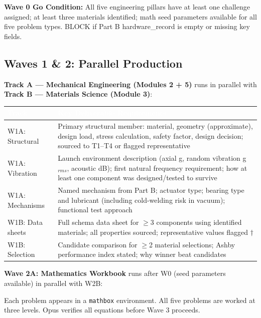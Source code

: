 \documentclass[11pt,letterpaper]{article}
\newcommand{\tableheader}[1]{\textbf{\sffamily\textcolor{white}{#1}}}
\begin{document}
\textbf{Wave 0 Go Condition:} All five engineering pillars have at least one challenge assigned; at least three materials identified; math seed parameters available for all five problem types. BLOCK if Part B hardware\_record is empty or missing key fields.

\subsection{Waves 1 \& 2: Parallel Production}

\textbf{Track A — Mechanical Engineering (Modules 2 + 5)} runs in parallel with \textbf{Track B — Materials Science (Module 3)}:

\begin{center}
\begin{tabularx}{\textwidth}{L{2.5cm}X}
\toprule
{}
\tableheader{Track} & \tableheader{Key Deliverable Requirements} \\
\midrule
W1A: Structural & Primary structural member: material, geometry (approximate), design load, stress calculation, safety factor, design decision; sourced to T1--T4 or flagged representative \\
W1A: Vibration & Launch environment description (axial g, random vibration g$_{rms}$, acoustic dB); first natural frequency requirement; how at least one component was designed/tested to survive \\
W1A: Mechanisms & Named mechanism from Part B; actuator type; bearing type and lubricant (including cold-welding risk in vacuum); functional test approach \\
W1B: Data sheets & Full schema data sheet for $\geq$3 components using identified materials; all properties sourced; representative values flagged $\dagger$ \\
W1B: Selection & Candidate comparison for $\geq$2 material selections; Ashby performance index stated; why winner beat candidates \\
\bottomrule
\end{tabularx}
\end{center}

\textbf{Wave 2A: Mathematics Workbook} runs after W0 (seed parameters available) in parallel with W2B:

Each problem appears in a \texttt{mathbox} environment. All five problems are worked at three levels. Opus verifies all equations before Wave 3 proceeds.
\end{document}
